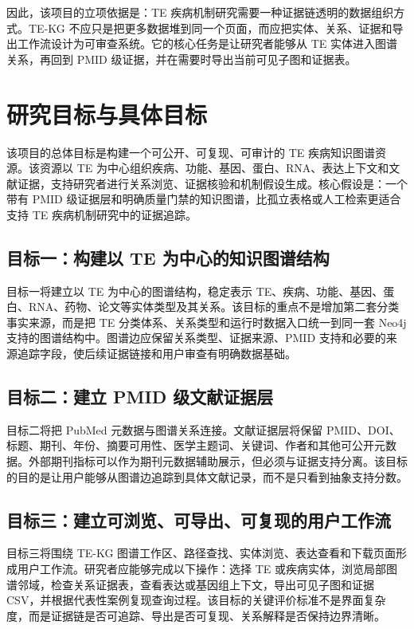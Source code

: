 \documentclass[12pt,a4paper,UTF8]{ctexart}
\begin{document}
因此，该项目的立项依据是：TE 疾病机制研究需要一种证据链透明的数据组织方式。TE-KG 不应只是把更多数据堆到同一个页面，而应把实体、关系、证据和导出工作流设计为可审查系统。它的核心任务是让研究者能够从 TE 实体进入图谱关系，再回到 PMID 级证据，并在需要时导出当前可见子图和证据表。

\section{研究目标与具体目标}

该项目的总体目标是构建一个可公开、可复现、可审计的 TE 疾病知识图谱资源。该资源以 TE 为中心组织疾病、功能、基因、蛋白、RNA、表达上下文和文献证据，支持研究者进行关系浏览、证据核验和机制假设生成。核心假设是：一个带有 PMID 级证据层和明确质量门禁的知识图谱，比孤立表格或人工检索更适合支持 TE 疾病机制研究中的证据追踪。

\subsection{目标一：构建以 TE 为中心的知识图谱结构}

目标一将建立以 TE 为中心的图谱结构，稳定表示 TE、疾病、功能、基因、蛋白、RNA、药物、论文等实体类型及其关系。该目标的重点不是增加第二套分类事实来源，而是把 TE 分类体系、关系类型和运行时数据入口统一到同一套 Neo4j 支持的图谱结构中。图谱边应保留关系类型、证据来源、PMID 支持和必要的来源追踪字段，使后续证据链接和用户审查有明确数据基础。

\subsection{目标二：建立 PMID 级文献证据层}

目标二将把 PubMed 元数据与图谱关系连接。文献证据层将保留 PMID、DOI、标题、期刊、年份、摘要可用性、医学主题词、关键词、作者和其他可公开元数据。外部期刊指标可以作为期刊元数据辅助展示，但必须与证据支持分离。该目标的目的是让用户能够从图谱边追踪到具体文献记录，而不是只看到抽象支持分数。

\subsection{目标三：建立可浏览、可导出、可复现的用户工作流}

目标三将围绕 TE-KG 图谱工作区、路径查找、实体浏览、表达查看和下载页面形成用户工作流。研究者应能够完成以下操作：选择 TE 或疾病实体，浏览局部图谱邻域，检查关系证据表，查看表达或基因组上下文，导出可见子图和证据 CSV，并根据代表性案例复现查询过程。该目标的关键评价标准不是界面复杂度，而是证据链是否可追踪、导出是否可复现、关系解释是否保持边界清晰。
\end{document}
